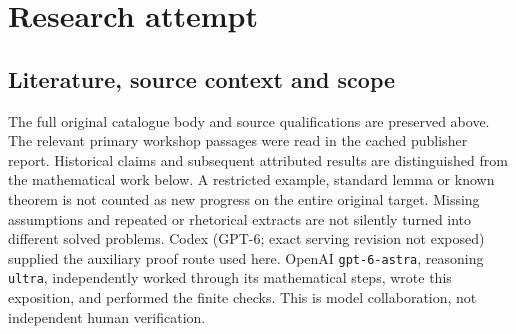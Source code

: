 \documentclass[11pt]{article}
\begin{document}
\section{Research attempt}
\subsection{Literature, source context and scope}
The full original catalogue body and source qualifications are preserved above. The relevant primary workshop passages were read in the cached publisher report. Historical claims and subsequent attributed results are distinguished from the mathematical work below. A restricted example, standard lemma or known theorem is not counted as new progress on the entire original target. Missing assumptions and repeated or rhetorical extracts are not silently turned into different solved problems.
Codex (GPT-6; exact serving revision not exposed) supplied the auxiliary proof route used here. OpenAI \texttt{gpt-6-astra}, reasoning \texttt{ultra}, independently worked through its mathematical steps, wrote this exposition, and performed the finite checks. This is model collaboration, not independent human verification.
\end{document}
